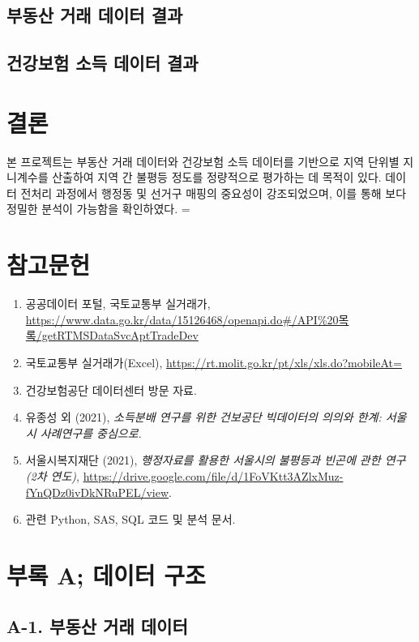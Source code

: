 \documentclass[a4paper,10pt]{article}
\begin{document}
\subsection{부동산 거래 데이터 결과}


\subsection{건강보험 소득 데이터 결과}


\section{결론}
본 프로젝트는 부동산 거래 데이터와 건강보험 소득 데이터를 기반으로 지역 단위별 지니계수를 산출하여 지역 간 불평등 정도를 정량적으로 평가하는 데 목적이 있다. 데이터 전처리 과정에서 행정동 및 선거구 매핑의 중요성이 강조되었으며, 이를 통해 보다 정밀한 분석이 가능함을 확인하였다. =

\section{참고문헌}
\begin{enumerate}
    \item 공공데이터 포털, 국토교통부 실거래가, \url{https://www.data.go.kr/data/15126468/openapi.do#/API%20목록/getRTMSDataSvcAptTradeDev}
    \item 국토교통부 실거래가(Excel), \url{https://rt.molit.go.kr/pt/xls/xls.do?mobileAt=}
    \item 건강보험공단 데이터센터 방문 자료.
    \item 유종성 외 (2021), \textit{소득분배 연구를 위한 건보공단 빅데이터의 의의와 한계: 서울시 사례연구를 중심으로}.
    \item 서울시복지재단 (2021), \textit{행정자료를 활용한 서울시의 불평등과 빈곤에 관한 연구 (2차 연도)}, \url{https://drive.google.com/file/d/1FoVKtt3AZlxMuz-fYnQDz0ivDkNRuPEL/view}.
    \item 관련 Python, SAS, SQL 코드 및 분석 문서.
\end{enumerate}

\newpage


\section{부록 A; 데이터 구조}
\subsection{A-1. 부동산 거래 데이터}
\end{document}
